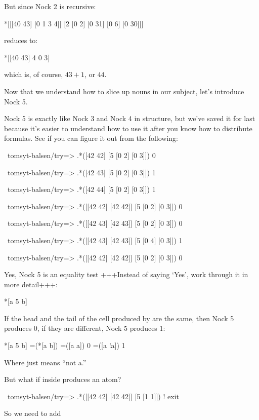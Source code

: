 But since Nock 2 is recursive:

\begin{code}
*[[[40 43] [0 1 3 4]] [2 [0 2] [0 31] [0 6] [0 30]]]
\end{code}
reduces to:

\begin{code}
*[[40 43] 4 0 3]
\end{code}
which is, of course, \(43 + 1\), or \(44\).

Now that we understand how to slice up nouns in our subject, let's introduce Nock 5.

Nock 5 is exactly like Nock 3 and Nock 4 in structure, but we've saved it for
last because it's easier to understand how to use it after you know how to
distribute formulas. See if you can figure it out from the following:

\begin{code}
~tomsyt-balsen/try=> .*([42 42] [5 [0 2] [0 3]])
0

~tomsyt-balsen/try=> .*([42 43] [5 [0 2] [0 3]])
1

~tomsyt-balsen/try=> .*([42 44] [5 [0 2] [0 3]])
1

~tomsyt-balsen/try=> .*([[42 42] [42 42]] [5 [0 2] [0 3]])
0

~tomsyt-balsen/try=> .*([[42 43] [42 43]] [5 [0 2] [0 3]])
0

~tomsyt-balsen/try=> .*([[42 43] [42 43]] [5 [0 4] [0 3]])
1

~tomsyt-balsen/try=> .*([[42 42] [42 42]] [5 [0 2] [0 3]])
0
\end{code}

Yes, Nock 5 is an equality test +++Instead of saying `Yes', work through it in more detail+++:

\begin{code}
*[a 5 b]
\end{code}
If the head and the tail of the cell produced by \kode{*[a b]} are the same, then
Nock 5 produces 0, if they are different, Nock 5 produces 1:

\begin{code}
*[a 5 b]              =(*[a b])
=([a a])              0
=([a !a])              1
\end{code}
Where  just means ``not a.''

But what if \kode{*[a b]} inside \kode{=(*[a b])} produces an atom?

\begin{code}
~tomsyt-balsen/try=> .*([[42 42] [42 42]] [5 [1 1]])
! exit
\end{code}
So we need to add

